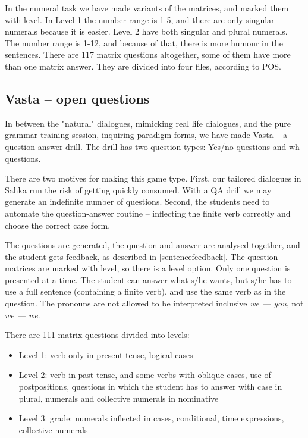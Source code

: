 \documentclass[a4paper,12pt]{article}
\begin{document}
In the numeral task we have made variants of the matrices, and marked them with level. In Level 1 the number range is 1-5, and there are only singular numerals because it is easier. Level 2 have both singular and plural numerals. The number range is 1-12, and because of that, there is more humour in the sentences. There are 117 matrix questions altogether, some of them have more than one matrix answer. They are divided into four files, according to POS.




\subsection{Vasta -- open questions}	

In between the "natural" dialogues, mimicking real life dialogues, and the pure grammar training session, inquiring paradigm forms, we have made Vasta -- a question-answer drill. The drill has two question types: Yes/no questions and wh-questions. 

There are two motives for making this game type. First, our tailored dialogues in Sahka run the risk of getting quickly consumed. With a QA drill we may generate an indefinite number of questions. Second, the students need to automate the question-answer routine -- inflecting the finite verb correctly and choose the correct case form.

The questions are generated, the question and answer are analysed together, and the student gets feedback, as described in \ref{sentencefeedback}. The question matrices are marked with level, so there is a level option. Only one question is presented at a time. The student can answer what s/he wants, but s/he has to use a full sentence (containing a finite verb), and use the same verb as in the question. The pronouns are not allowed to be interpreted inclusive \textit{we — you}, not \textit{we — we}.

There are 111 matrix questions divided into levels:
\begin{itemize}
\item Level 1: verb only in present tense, logical cases
\item  Level 2: verb in past tense, and some verbs with oblique cases, use of postpositions, questions in which the student has to answer with case in plural,  numerals and collective numerals in nominative
\item  Level 3: grade: numerals inflected in cases, conditional, time expressions, collective numerals
\end{itemize}
\vspace{0.5cm}
\end{document}

